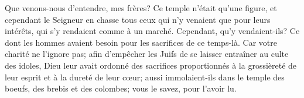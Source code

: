 Que venons-nous d’entendre, mes frères?
Ce temple n’était qu’une figure,
	et cependant le Seigneur en chasse tous ceux
		qui n’y venaient que pour leurs intérêts,
	qui s’y rendaient comme à un marché.
Cependant, qu’y vendaient-ils?
Ce dont les hommes avaient besoin pour les sacrifices de ce temps-là.
Car votre charité ne l’ignore pas;
	afin d’empêcher les Juifs de se laisser entraîner au culte des idoles,
	Dieu leur avait ordonné des sacrifices
		proportionnés à la grossièreté de leur esprit et à la dureté de leur cœur;
	aussi immolaient-ils dans le temple des boeufs, des brebis et des colombes;
	vous le savez, pour l’avoir lu.
